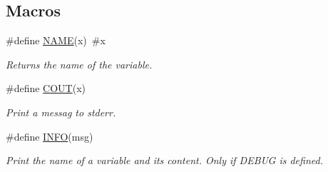 \subsection*{Macros}
\begin{DoxyCompactItemize}
\item 
\#define \mbox{\hyperlink{utils_8hh_a14111ac8f43949172b152e50dc720aba}{N\+A\+ME}}(x)~\#x
\begin{DoxyCompactList}\small\item\em Returns the name of the variable. \end{DoxyCompactList}\item 
\#define \mbox{\hyperlink{utils_8hh_a051dcff3fa35db18fbabb4fde1bd1167}{C\+O\+UT}}(x)
\begin{DoxyCompactList}\small\item\em Print a messag to stderr. \end{DoxyCompactList}\item 
\#define \mbox{\hyperlink{utils_8hh_a3ae64706314066fdc8b6c8029a915aa7}{I\+N\+FO}}(msg)
\begin{DoxyCompactList}\small\item\em Print the name of a variable and its content. Only if D\+E\+B\+UG is defined. \end{DoxyCompactList}\end{DoxyCompactItemize}
